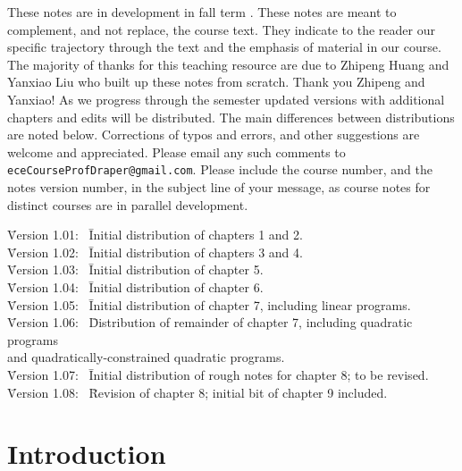 \documentclass{tufte-book} %
\theoremstyle{definition}
\theoremstyle{remark}
\numberwithin{section}{chapter}
\numberwithin{equation}{chapter}
\numberwithin{figure}{chapter}
\begin{document}
\noindent These notes are in development in fall term \the\year.
These notes are meant to complement, and not replace, the course text.
They indicate to the reader our specific trajectory through the text
and the emphasis of material in our course.  The majority of thanks
for this teaching resource are due to Zhipeng Huang and Yanxiao Liu
who built up these notes from scratch.  Thank you Zhipeng and Yanxiao!
As we progress through the semester updated versions with additional
chapters and edits will be distributed.  The main differences between
distributions are noted below.  Corrections of typos and errors, and
other suggestions are welcome and appreciated.  Please email any such
comments to \texttt{eceCourseProfDraper@gmail.com}.  Please include
the course number, and the notes version number,  in the subject line of your message, as course notes
for distinct courses are in parallel development. \vspace{0.2in} \\

\begin{tabbing}
\noindent \= Version 1.01: \ \= Initial distribution of chapters 1 and 2.\\
\noindent \= Version 1.02: \ \= Initial distribution of chapters 3 and 4.\\
\noindent \= Version 1.03: \ \= Initial distribution of chapter 5.\\
\noindent \= Version 1.04: \ \= Initial distribution of chapter 6.\\
\noindent \= Version 1.05: \ \= Initial distribution of chapter 7, including linear programs.\\
\noindent \= Version 1.06: \ \= Distribution of remainder of chapter 7, including quadratic programs \\ \hspace{6em} and quadratically-constrained quadratic programs.\\
\noindent \= Version 1.07: \ \= Initial distribution of rough notes for chapter 8; to be revised.\\
\noindent \= Version 1.08: \ \= Revision of chapter 8; initial bit of chapter 9 included.\\

\end{tabbing}

\newpage
\mainmatter


\chapter{Introduction}
\label{ch.intro}

\end{document}

